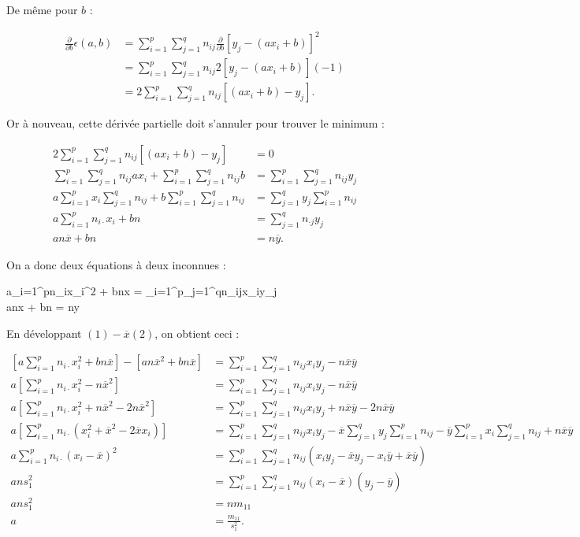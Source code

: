 \documentclass{article}
\renewcommand{\pd}[1]{\frac {\partial}{\partial #1}}
\begin{document}
			De même pour $b$ :

			\[\begin{aligned}
				\pd b\epsilon(a, b) &= \sum_{i=1}^p\sum_{j=1}^qn_{ij}\pd b[y_j-(ax_i+b)]^2 \\
									&= \sum_{i=1}^p\sum_{j=1}^qn_{ij}2[y_j-(ax_i+b)](-1) \\
									&= 2\sum_{i=1}^p\sum_{j=1}^qn_{ij}[(ax_i+b)-y_j].
			\end{aligned}\]

			Or à nouveau, cette dérivée partielle doit s'annuler pour trouver le minimum :

			\[\begin{aligned}
				2\sum_{i=1}^p\sum_{j=1}^qn_{ij}[(ax_i+b)-y_j] &= 0 \\
				\sum_{i=1}^p\sum_{j=1}^qn_{ij}ax_i + \sum_{i=1}^p\sum_{j=1}^qn_{ij}b &= \sum_{i=1}^p\sum_{j=1}^qn_{ij}y_j \\
				a\sum_{i=1}^px_i\sum_{j=1}^qn_{ij} + b\sum_{i=1}^p\sum_{j=1}^qn_{ij} &= \sum_{j=1}^qy_j\sum_{i=1}^pn_{ij} \\
				a\sum_{i=1}^pn_{i\cdot}x_i + bn &= \sum_{j=1}^qn_{\cdot j}y_j \\
				an\overline x + bn &= n\overline y.
			\end{aligned}\]

			On a donc deux équations à deux inconnues :

			\begin{numcases}{}
					a\sum_{i=1}^pn_{i\cdot}x_i^2 + bn\overline x = \sum_{i=1}^p\sum_{j=1}^qn_{ij}x_iy_j \\
					an\overline x + bn = n\overline y
			\end{numcases}

			En développant $(1) - \overline x(2)$, on obtient ceci :

			\[\begin{aligned}
				\left[a\sum_{i=1}^pn_{i\cdot}x_i^2 + bn\overline x\right]-\left[an\overline x^2 + bn\overline x\right] &= \sum_{i=1}^p\sum_{j=1}^qn_{ij}x_iy_j - n\overline x\overline y \\
				a\left[\sum_{i=1}^pn_{i\cdot}x_i^2 - n\overline x^2\right] &= \sum_{i=1}^p\sum_{j=1}^qn_{ij}x_iy_j - n\overline x\overline y \\
				a\left[\sum_{i=1}^pn_{i\cdot}x_i^2 + n\overline x^2 - 2n\overline x^2\right] &= \sum_{i=1}^p\sum_{j=1}^qn_{ij}x_iy_j + n\overline x\overline y - 2n\overline x\overline y \\
				a\left[\sum_{i=1}^pn_{i\cdot}(x_i^2 + \overline x^2 - 2\overline xx_i)\right] &= \sum_{i=1}^p\sum_{j=1}^qn_{ij}x_iy_j - \overline x\sum_{j=1}^qy_j\sum_{i=1}^pn_{ij} - \overline y\sum_{i=1}^px_i\sum_{j=1}^qn_{ij} + n\overline x\overline y \\
				a\sum_{i=1}^pn_{i\cdot}(x_i-\overline x)^2 &= \sum_{i=1}^p\sum_{j=1}^qn_{ij}(x_iy_j - \overline xy_j - x_i\overline y + \overline x\overline y) \\
				ans_1^2 &= \sum_{i=1}^p\sum_{j=1}^qn_{ij}(x_i-\overline x)(y_j-\overline y) \\
				ans_1^2 &= nm_{11} \\
				a &= \frac {m_{11}}{s_1^2}.
			\end{aligned}\]
\end{document}
